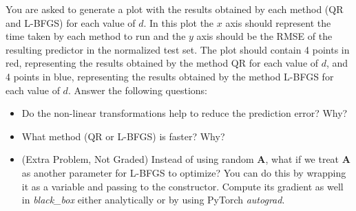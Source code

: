 \documentclass[submit]{harvardml}
\begin{document}
\begin{problem}[14pts]
You are asked to generate a plot
with the results obtained by each method (QR and L-BFGS)
for each value of $d$. In this plot
the $x$ axis should represent the time taken by each method to
run and the $y$ axis should be the RMSE of the resulting predictor in the
normalized test set. The plot should
contain 4 points in red, representing the results obtained by the method QR for
each value of $d$, and 4 points in blue, representing the results obtained
by the method L-BFGS for each value of $d$. Answer the following questions:
\begin{itemize}
\item Do the non-linear transformations help to reduce the prediction error? Why?
\item What method (QR or L-BFGS) is faster? Why?
\item (Extra Problem, Not Graded) Instead of using random $\mathbf{A}$, what if we treat
  $\mathbf{A}$ as another parameter for L-BFGS to optimize? You can do
  this by wrapping it as a variable and passing to the
  constructor. Compute its gradient as well in \textit{black\_box}
  either analytically or by using PyTorch \textit{autograd}.


\end{itemize}
\vspace{0.1cm}
\end{problem}
\end{document}
